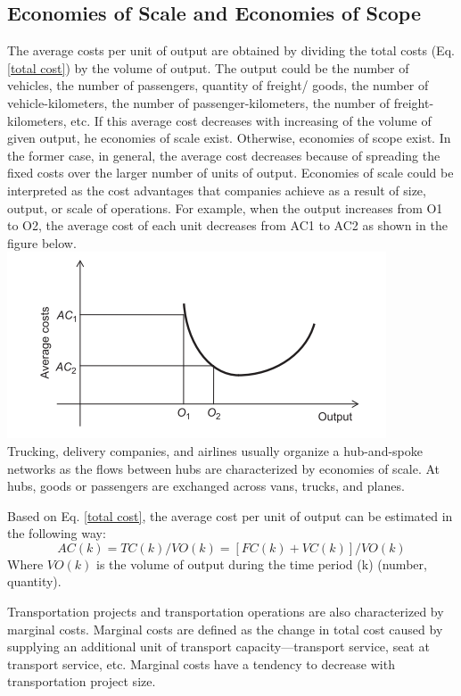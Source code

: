 \subsection{Economies of Scale and Economies of Scope}
The average costs per unit of output are obtained by dividing the total costs (Eq. \ref{total cost}) by the volume of output. The output could be the number of vehicles, the number of passengers, quantity of freight/ goods, the number of vehicle-kilometers, the number of passenger-kilometers, the number of freight-kilometers, etc. If this average cost decreases with increasing of the volume of given output, he economies of scale exist. Otherwise, economies of scope exist. In the former case, in general, the average cost decreases because of spreading the fixed costs over the larger number of units of output. Economies of scale could be interpreted as the cost advantages that companies achieve as a result of size, output, or scale of operations. For example, when the output increases from O1 to O2, the average cost of each unit decreases from AC1 to AC2 as shown in the figure below.\\
\includegraphics{gfx/fig12.png}\\
Trucking, delivery companies, and airlines usually organize a hub-and-spoke networks as the flows between hubs are characterized by economies of scale. At hubs, goods or passengers are exchanged across vans, trucks, and planes.\\
\par
Based on Eq. \ref{total cost}, the average cost per unit of output can be estimated in the following way:
\begin{equation}
	AC(k) = TC(k)/VO(k) = [FC(k) + VC(k)]/VO(k)
\end{equation}
Where $VO(k)$ is the volume of output during the time period (k) (number, quantity).\\
\par
Transportation projects and transportation operations are also characterized by marginal costs. Marginal costs are defined as the change in total cost caused by supplying an additional unit of transport capacity—transport service, seat at transport service, etc. Marginal costs have a tendency to decrease with transportation project size.\\
